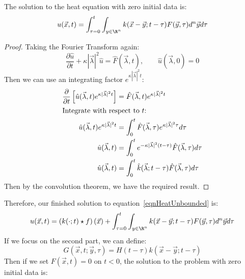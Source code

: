 \documentclass[../Main.tex]{subfiles}
\begin{document}
\begin{proposition}
    The solution to the heat equation with zero initial data is:
    \begin{equation*}
        u(\vec{x}, t) = \int_{\tau = 0}^{t} \int_{y \in \R^n} k(\vec{x} - \vec{y};t-\tau) F(\vec{y}, \tau)d^n \vec{y} d\tau 
    \end{equation*}
    \label{propHeadUnboundedSolnForced}
\end{proposition}
\begin{proof}
    Taking the Fourier Transform again:
    \begin{equation*}
        \frac{\partial \hat{u}}{\partial t} + \kappa |\vec{\lambda}|^2 \hat{u} = \hat{F}(\vec{\lambda}, t),\qquad \hat{u}(\vec{\lambda}, 0) = 0
    \end{equation*}
    Then we can use an integrating factor $e^{\kappa |\vec{\lambda}|^2 t}$:
    \begin{align*}
        \frac{\partial}{\partial t} \left[\hat{u}(\vec{\lambda}, t) e^{\kappa |\vec{\lambda}|^2 t}\right]&= \hat{F}(\vec{\lambda}, t) e^{\kappa |\vec{\lambda}|^2 t} \\
        \intertext{Integrate with respect to $t$:}
        \hat{u}(\vec{\lambda}, t) e^{\kappa |\vec{\lambda}|^2 t} &= \int_{0}^{t} \hat{F}(\vec{\lambda}, \tau) e^{\kappa |\vec{\lambda}|^2 \tau} d\tau \\
        \hat{u}(\vec{\lambda}, t) &= \int_{0}^{t} e^{-\kappa |\vec{\lambda}|^2 (t - \tau)}\hat{F}(\vec{\lambda}, \tau) d\tau \\
        \hat{u}(\vec{\lambda}, t) &= \int_{0}^{t} \hat{k}(\vec{\lambda};t-\tau)\hat{F}(\vec{\lambda}, \tau) d\tau \\
    \end{align*}
    Then by the convolution theorem, we have the required result.
\end{proof}
Therefore, our finished solution to equation~\ref{eqnHeatUnbounded} is:
\begin{equation}
    u(\vec{x}, t) = \left(k(\cdot; t) \star f\right)(\vec{x}) + \int_{\tau = 0}^{t} \int_{y \in \R^n} k(\vec{x} - \vec{y};t-\tau) F(\vec{y}, \tau)d^n \vec{y} d\tau 
    \label{eqnHeatUnboundedSoln}
\end{equation}
If we focus on the second part, we can define:
\begin{equation*}
    G(\vec{x}, t;\vec{y}, \tau) = H(t - \tau) k(\vec{x} - \vec{y}; t - \tau)
\end{equation*}
Then if we set $F(\vec{x}, t) = 0$ on $t < 0$, the solution to the problem with zero initial data is:
\end{document}
